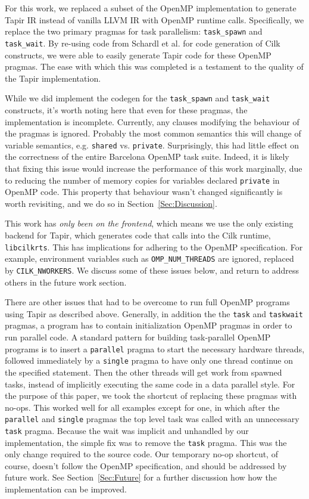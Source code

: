 \documentclass[sigconf]{acmart}
\begin{document}
For this work, we replaced a subset of the OpenMP implementation to generate
Tapir IR instead of vanilla LLVM IR with OpenMP runtime calls. Specifically, we
replace the two primary pragmas for task parallelism: \texttt{task\_spawn} and
\texttt{task\_wait}. By re-using code from Schardl et al. for code generation
of Cilk constructs, we were able to easily generate Tapir code for these OpenMP
pragmas. The ease with which this was completed is a testament to the quality of
the Tapir implementation. 

While we did implement the codegen for the \texttt{task\_spawn} and
\texttt{task\_wait} constructs, it's worth noting here that even for these
pragmas, the implementation is incomplete. Currently, any clauses modifying the
behaviour of the pragmas is ignored. Probably the most common semantics this
will change of variable semantics, e.g. \texttt{shared} vs. \texttt{private}.
Surprisingly, this had little effect on the correctness of the entire Barcelona
OpenMP task suite. Indeed, it is likely that fixing this issue would increase
the performance of this work marginally, due to reducing the number of memory
copies for variables declared \texttt{private} in OpenMP code. This property
that behaviour wasn't changed significantly is worth revisiting, and we do so
in Section~\ref{Sec:Discussion}. 

This work has \emph{only been on the frontend}, which means we use the only
existing backend for Tapir, which generates code that calls into the Cilk
runtime, \texttt{libcilkrts}. This has implications for adhering to the OpenMP
specification. For example, environment variables such as
\texttt{OMP\_NUM\_THREADS} are ignored, replaced by \texttt{CILK\_NWORKERS}.
We discuss some of these issues below, and return to address others in the
future work section. 

There are other issues that had to be overcome to run full OpenMP programs
using Tapir as described above. Generally, in addition the the \texttt{task} 
and \texttt{taskwait} pragmas, a program has to contain initialization OpenMP
pragmas in order to run parallel code. A standard pattern for building
task-parallel OpenMP programs is to insert a \texttt{parallel} pragma to start
the necessary hardware threads, followed immediately by a \texttt{single}
pragma to have only one thread continue on the specified statement. Then the
other threads will get work from spawned tasks, instead of implicitly executing
the same code in a data parallel style. For the purpose of this paper, we took
the shortcut of replacing these pragmas with no-ops. This worked well for all
examples except for one, in which after the \texttt{parallel} and
\texttt{single} pragmas the top level task was called with an unnecessary
\texttt{task} pragma.  Because the wait was implicit and unhandled by our
implementation, the simple fix was to remove the \texttt{task} pragma. This was
the only change required to the source code. Our temporary no-op shortcut, of
course, doesn't follow the OpenMP specification, and should be addressed by
future work. See Section~\ref{Sec:Future} for a further discussion how how the 
implementation can be improved.
\end{document}
